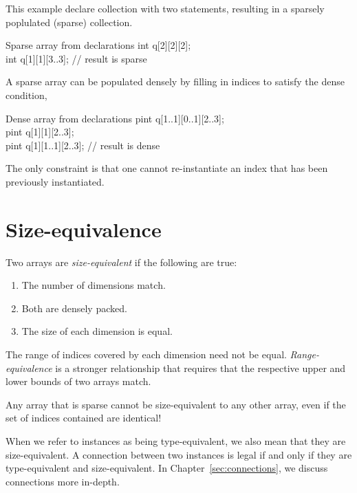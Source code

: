 This example declare collection  with two statements, 
resulting in a sparsely poplulated (sparse) collection.  

\begin{example}{Sparse array from declarations}
int q[2][2][2];\\
int q[1][1][3..3];   // result is sparse
\end{example}

A sparse array can be populated densely by filling in indices to satisfy
the dense condition, 

\begin{example}{Dense array from declarations}
pint q[1..1][0..1][2..3];\\
pint q[1][1][2..3];\\
pint q[1][1..1][2..3]; // result is dense
\end{example}

The only constraint is that one cannot re-instantiate an index
that has been previously instantiated.  

\section{Size-equivalence}
\label{sec:arrays:size}


Two arrays are \emph{size-equivalent} if the following are true:
\begin{enumerate}
\item The number of dimensions match.
\item Both are densely packed.  
\item The size of each dimension is equal.  
\end{enumerate}

The range of indices covered by each dimension need not be equal.  
\emph{Range-equivalence} is a stronger relationship that 
requires that the respective upper and lower bounds of two arrays match.  

Any array that is sparse cannot be size-equivalent to any other array, 
even if the set of indices contained are identical!  

When we refer to instances as being type-equivalent, 
we also mean that they are size-equivalent.  
A connection between two instances is legal if and only if 
they are type-equivalent and size-equivalent.  
In Chapter~\ref{sec:connections}, we discuss connections more in-depth.  

